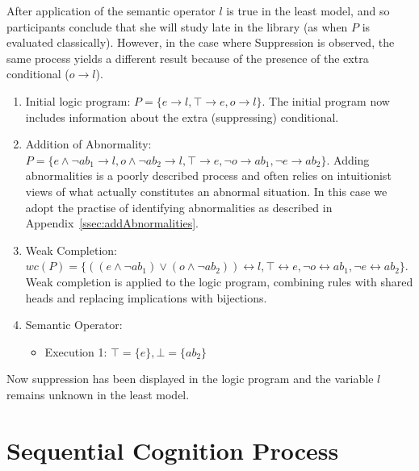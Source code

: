 \documentclass{article}
\begin{document}
After application of the semantic operator $l$ is true in the least model, and so participants conclude that she will study late in the library (as when $P$ is evaluated classically). However, in the case where Suppression is observed, the same process yields a different result because of the presence of the extra conditional ($o\rightarrow l$).
\begin{enumerate}
\item Initial logic program: $P = \{e \rightarrow l, \top \rightarrow e, o \rightarrow l \}$. The initial program now includes information about the extra (suppressing) conditional.
\item Addition of Abnormality: $P = \{e \land \lnot ab_1 \rightarrow l, o \land \lnot ab_2 \rightarrow l, \top \rightarrow e, \lnot o \rightarrow ab_1, \lnot e \rightarrow ab_2 \}$. Adding abnormalities is a poorly described process and often relies on intuitionist views of what actually constitutes an abnormal situation. In this case we adopt the practise of identifying abnormalities as described in Appendix~\ref{ssec:addAbnormalities}.
\item Weak Completion: $wc(P) = \{((e \land \lnot ab_1) \lor (o \land \lnot ab_2)) \leftrightarrow l, \top \leftrightarrow e, \lnot o \leftrightarrow ab_1, \lnot e \leftrightarrow ab_2 \}$. Weak completion is applied to the logic program, combining rules with shared heads and replacing implications with bijections.
\item Semantic Operator:
\begin{itemize}
\item Execution 1: $\top=\{e\}, \bot=\{ab_2\}$
\end{itemize}
\end{enumerate}

Now suppression has been displayed in the logic program and the variable $l$ remains unknown in the least model.

\section{Sequential Cognition Process}
\end{document}
